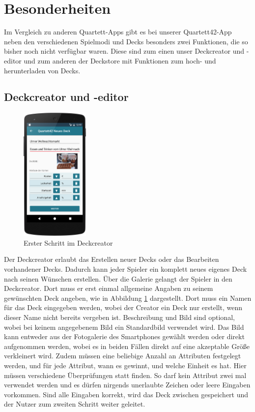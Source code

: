\section{Besonderheiten}
\label{sec:implementierung:besonderheiten }

Im Vergleich zu anderen Quartett-Apps gibt es bei unserer Quartett42-App neben den verschiedenen Spielmodi und Decks besonders zwei Funktionen, die so bisher noch nicht verfügbar waren. Diese sind zum einen unser Deckcreator und -editor und zum anderen der Deckstore mit Funktionen zum hoch- und herunterladen von Decks.	

\subsection{Deckcreator und -editor}
\label{sec:implementierung:besonderheiten:deckcreator }

\begin{figure}[htp]
	\centering
  	\includegraphics[width=0.3\textwidth]{img/screenshots/device_new_deck.png}
	\caption{Erster Schritt im Deckcreator}
	\label{figure:implementierungdeckcreator}
\end{figure}

Der Deckcreator erlaubt das Erstellen neuer Decks oder das Bearbeiten vorhandener Decks. Dadurch kann jeder Spieler ein komplett neues eigenes Deck nach seinen Wünschen erstellen. Über die Galerie gelangt der Spieler in den Deckcreator. Dort muss er erst einmal allgemeine Angaben zu seinem gewünschten Deck angeben, wie in Abbildung \ref{figure:implementierungdeckcreator} dargestellt. Dort muss ein Namen für das Deck eingegeben werden, wobei der Creator ein Deck nur erstellt, wenn dieser Name nicht bereits vergeben ist. Beschreibung und Bild sind optional, wobei bei keinem angegebenem Bild ein Standardbild verwendet wird. Das Bild kann entweder aus der Fotogalerie des Smartphones gewählt werden oder direkt aufgenommen werden, wobei es in beiden Fällen direkt auf eine akzeptable Größe verkleinert wird. Zudem müssen eine beliebige Anzahl an Attributen festgelegt werden, und für jede Attribut, wann es gewinnt, und welche Einheit es hat. Hier müssen verschiedene Überprüfungen statt finden. So darf kein Attribut zwei mal verwendet werden und es dürfen nirgends unerlaubte Zeichen oder leere Eingaben vorkommen. Sind alle Eingaben korrekt, wird das Deck zwischen gespeichert und der Nutzer zum zweiten Schritt weiter geleitet.

